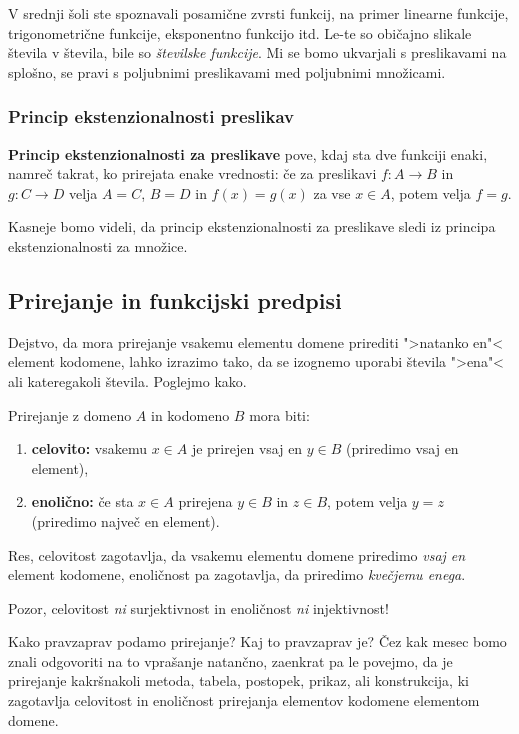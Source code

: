 V srednji šoli ste spoznavali posamične zvrsti funkcij, na primer linearne funkcije, trigonometrične funkcije, eksponentno funkcijo itd. Le-te so običajno slikale števila v števila, bile so \emph{številske funkcije}. Mi se bomo ukvarjali s preslikavami na splošno, se pravi s poljubnimi preslikavami med poljubnimi množicami.

\subsubsection{Princip ekstenzionalnosti preslikav}

\textbf{Princip ekstenzionalnosti za preslikave} pove, kdaj sta dve funkciji enaki, namreč takrat, ko prirejata enake vrednosti:  če za preslikavi $f : A \to B$ in $g : C \to D$ velja $A = C$, $B = D$ in $f(x) = g(x)$ za vse $x \in A$, potem velja $f = g$.

Kasneje bomo videli, da princip ekstenzionalnosti za preslikave sledi iz principa ekstenzionalnosti za množice.

\subsection{Prirejanje in funkcijski predpisi}

Dejstvo, da mora prirejanje vsakemu elementu domene prirediti ">natanko en"< element kodomene, lahko izrazimo tako, da se izognemo uporabi števila ">ena"< ali kateregakoli števila. Poglejmo kako.

Prirejanje z domeno $A$ in kodomeno $B$ mora biti:
%
\begin{enumerate}
\item \textbf{celovito:} vsakemu $x \in A$ je prirejen vsaj en $y \in B$ (priredimo vsaj en element),
\item \textbf{enolično:} če sta $x \in A$ prirejena $y \in B$ in $z \in B$, potem velja $y = z$ (priredimo največ en element).
\end{enumerate}
%
Res, celovitost zagotavlja, da vsakemu elementu domene priredimo \emph{vsaj en} element kodomene, enoličnost pa zagotavlja, da priredimo \emph{kvečjemu enega}.

\begin{opomba}
  Pozor, celovitost \emph{ni} surjektivnost in enoličnost \emph{ni} injektivnost!
\end{opomba}

Kako pravzaprav podamo prirejanje? Kaj to pravzaprav je? Čez kak mesec bomo znali odgovoriti na to vprašanje natančno, zaenkrat pa le povejmo, da je prirejanje kakršnakoli metoda, tabela, postopek, prikaz, ali konstrukcija, ki zagotavlja celovitost in enoličnost prirejanja elementov kodomene elementom domene.

